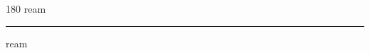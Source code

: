 
\begin{frame}
\begin{center}
\begin{turn}{180}
{\fontsize{2.5cm}{1em}\selectfont ream}
\end{turn}
\vspace{1em}\par  
\hrule
\vspace{1em}\par  
{\fontsize{2.5cm}{1em}\selectfont ream}
\end{center}
\end{frame}
